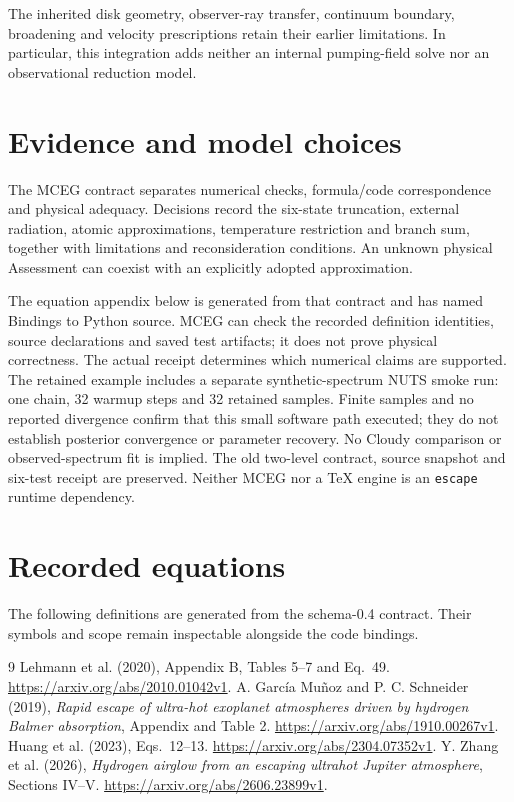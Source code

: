 \documentclass[11pt,a4paper]{article}
\begin{document}
The inherited disk geometry, observer-ray transfer, continuum boundary,
broadening and velocity prescriptions retain their earlier limitations.
In particular, this integration adds neither an internal pumping-field solve
nor an observational reduction model.

\section{Evidence and model choices}
The MCEG contract separates numerical checks, formula/code correspondence
and physical adequacy. Decisions record the six-state truncation, external
radiation, atomic approximations, temperature restriction and branch sum,
together with limitations and reconsideration conditions. An unknown physical
Assessment can coexist with an explicitly adopted approximation.

The equation appendix below is generated from that contract and has named
Bindings to Python source. MCEG can check the recorded definition identities,
source declarations and saved test artifacts; it does not prove physical
correctness. The actual receipt determines which numerical claims are
supported. The retained example includes a separate synthetic-spectrum NUTS
smoke run: one chain, 32 warmup steps and 32 retained samples. Finite samples
and no reported divergence confirm that this small software path executed;
they do not establish posterior convergence or parameter recovery. No Cloudy
comparison or observed-spectrum fit is implied.
The old two-level contract, source snapshot and six-test receipt are preserved.
Neither MCEG nor a TeX engine is an \texttt{escape} runtime dependency.

\appendix
\section{Recorded equations}\label{sec:equations}
The following definitions are generated from the schema-0.4 contract. Their
symbols and scope remain inspectable alongside the code bindings.


\begin{thebibliography}{9}
Lehmann et al. (2020), Appendix B, Tables 5--7 and Eq.~49.
\url{https://arxiv.org/abs/2010.01042v1}.
A. Garc\'ia Mu\~noz and P. C. Schneider (2019),
\emph{Rapid escape of ultra-hot exoplanet atmospheres driven by hydrogen
Balmer absorption}, Appendix and Table 2.
\url{https://arxiv.org/abs/1910.00267v1}.
Huang et al. (2023), Eqs.~12--13.
\url{https://arxiv.org/abs/2304.07352v1}.
Y. Zhang et al. (2026), \emph{Hydrogen airglow from an escaping ultrahot
Jupiter atmosphere}, Sections IV--V.
\url{https://arxiv.org/abs/2606.23899v1}.
\end{thebibliography}
\end{document}
